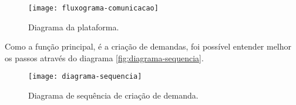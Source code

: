 \begin{figure}[htpb]
    \captionsetup{width=0.43\textwidth}
    \caption{Diagrama da plataforma.}
    \label{fig:fluxograma-comunicacao}
    \texttt{[image: fluxograma-comunicacao]}
    \fonte{}
\end{figure}

Como a função principal, é a criação de demandas, foi possível entender melhor os passos através do diagrama \autoref{fig:diagrama-sequencia}.

\begin{figure}[htpb]
    \captionsetup{width=0.43\textwidth}
    \caption{Diagrama de sequência de criação de demanda.}
    \label{fig:diagrama-sequencia}
    \texttt{[image: diagrama-sequencia]}
    \fonte{}
\end{figure}

\renewcommand{\labelenumii}{\arabic{enumi}.\arabic{enumii}}
\renewcommand{\labelenumiii}{\arabic{enumi}.\arabic{enumii}.\arabic{enumiii}}
\renewcommand{\labelenumiv}{\arabic{enumi}.\arabic{enumii}.\arabic{enumiii}.\arabic{enumiv}}

